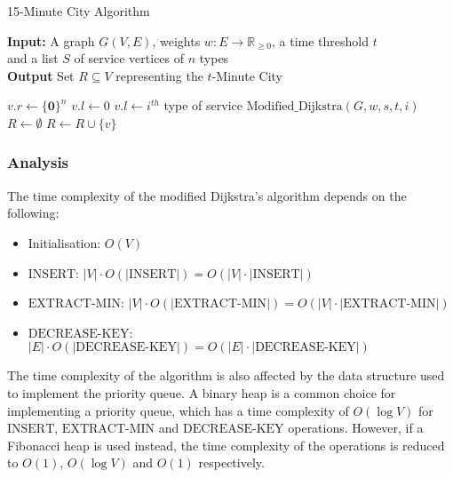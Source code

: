 \begin{algorithm}[H]
    \caption{15-Minute City Algorithm}\label{alg:15mc}
    \textbf{Input:} A graph $G(V,E)$, weights $w:E\rightarrow\mathbb{R}_{\geq 0}$, a time threshold $t$ \\  and a list $S$ of service vertices of $n$ types\\
    \textbf{Output} Set $R\subseteq V$ representing the $t$-Minute City
    \begin{algorithmic}
            \State $v.r \gets \{\mathbf{0}\}^{n}$
            \State $v.l \gets 0$
        \EndFor
            \State $v.l \gets i^{th}$ type of service
        \EndFor
                \State $\text{Modified_Dijkstra}(G,w,s,t,i)$
            \EndFor
        \EndFor
        \State $R\gets\emptyset$
                \State $R \gets R\cup \{v\}$
            \EndIf
        \EndFor
    \end{algorithmic}
\end{algorithm}

\subsubsection{Analysis}

The time complexity of the modified Dijkstra's algorithm depends on the following:

\begin{itemize}
    \item Initialisation: $O(V)$
    \item $\text{INSERT}$: $|V|\cdot O(|\text{INSERT}|)=O(|V|\cdot|\text{INSERT}|)$
    \item $\text{EXTRACT-MIN}$: $|V|\cdot O(|\text{EXTRACT-MIN}|)=O(|V|\cdot|\text{EXTRACT-MIN}|)$
    \item $\text{DECREASE-KEY}$: $|E|\cdot O(|\text{DECREASE-KEY}|)=O(|E|\cdot|\text{DECREASE-KEY}|)$
\end{itemize}

The time complexity of the algorithm is also affected by the data structure used to implement the priority queue. A binary heap is a common choice for implementing a priority queue, which has a time complexity of $O(\log V)$ for $\text{INSERT}$, $\text{EXTRACT-MIN}$ and $\text{DECREASE-KEY}$ operations. However, if a Fibonacci heap is used instead, the time complexity of the operations is reduced to $O(1)$, $O(\log V)$ and $O(1)$ respectively.

